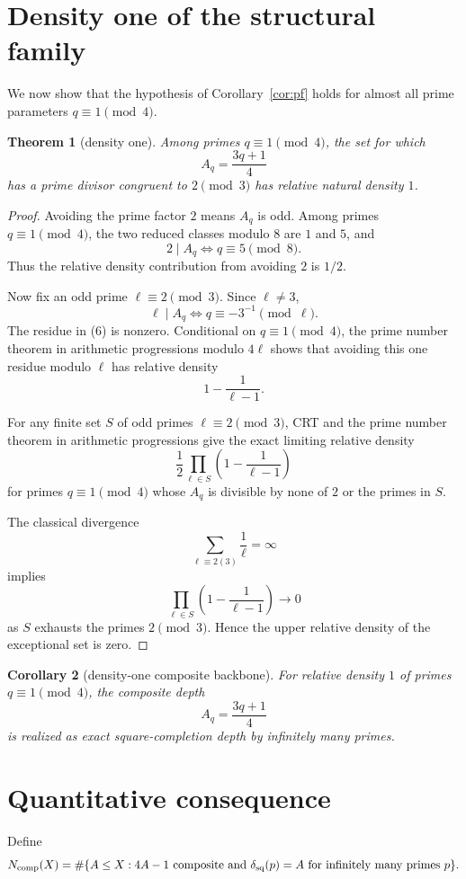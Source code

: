 \documentclass[11pt]{article}
\newtheorem{theorem}{Theorem}
\newtheorem{corollary}[theorem]{Corollary}
\theoremstyle{definition}
\begin{document}
\section{Density one of the structural family}
We now show that the hypothesis of Corollary~\ref{cor:pf} holds for almost all prime parameters $q\equiv1\pmod4$.

\begin{theorem}[density one]\label{thm:density}
Among primes $q\equiv1\pmod4$, the set for which
\[
A_q=\frac{3q+1}{4}
\]
has a prime divisor congruent to $2\pmod3$ has relative natural density $1$.
\end{theorem}

\begin{proof}
Avoiding the prime factor $2$ means $A_q$ is odd.  Among primes $q\equiv1\pmod4$, the two reduced classes modulo $8$ are $1$ and $5$, and
\[
2\mid A_q\iff q\equiv5\pmod8.
\]
Thus the relative density contribution from avoiding $2$ is $1/2$.

Now fix an odd prime $\ell\equiv2\pmod3$.  Since $\ell\ne3$,
\[
\ell\mid A_q
\iff
q\equiv-3^{-1}\pmod\ell. \tag{6}
\]
The residue in (6) is nonzero.  Conditional on $q\equiv1\pmod4$, the prime number theorem in arithmetic progressions modulo $4\ell$ shows that avoiding this one residue modulo $\ell$ has relative density
\[
1-\frac1{\ell-1}.
\]

For any finite set $S$ of odd primes $\ell\equiv2\pmod3$, CRT and the prime number theorem in arithmetic progressions give the exact limiting relative density
\[
\frac12\prod_{\ell\in S}\left(1-\frac1{\ell-1}\right) \tag{7}
\]
for primes $q\equiv1\pmod4$ whose $A_q$ is divisible by none of $2$ or the primes in $S$.

The classical divergence
\[
\sum_{\ell\equiv2(3)}\frac1\ell=\infty
\]
implies
\[
\prod_{\ell\in S}\left(1-\frac1{\ell-1}\right)\to0
\]
as $S$ exhausts the primes $2\pmod3$.  Hence the upper relative density of the exceptional set is zero.
\end{proof}

\begin{corollary}[density-one composite backbone]
For relative density $1$ of primes $q\equiv1\pmod4$, the composite depth
\[
\boxed{A_q=\frac{3q+1}{4}}
\]
is realized as exact square-completion depth by infinitely many primes.
\end{corollary}

\section{Quantitative consequence}
Define
\[
N_{\rm comp}(X)=\#\{A\le X:4A-1\text{ composite and }\delta_{\rm sq}(p)=A\text{ for infinitely many primes }p\}.
\]
\end{document}
